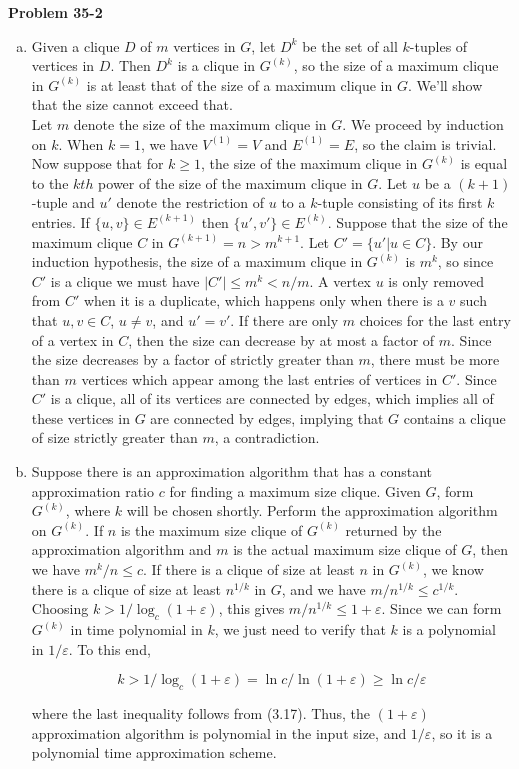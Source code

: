 \documentclass{article}
\begin{document}
\noindent\textbf{Problem 35-2}
\begin{enumerate}[a.]
\item Given a clique $D$ of $m$ vertices in $G$, let $D^{k}$ be the set of all $k$-tuples of vertices in $D$.  Then $D^k$ is a clique in $G^{(k)}$, so the size of a maximum clique in $G^{(k)}$ is at least that of the size of a maximum clique in $G$.  We'll show that the size cannot exceed that. \\

Let $m$ denote the size of the maximum clique in $G$.  We proceed by induction on $k$.  When $k=1$, we have $V^{(1)} = V$ and $E^{(1)} = E$, so the claim is trivial.  Now suppose that for $k \geq 1$, the size of the maximum clique in $G^{(k)}$ is equal to the $kth$ power of the size of the maximum clique in $G$.  Let $u$ be a $(k+1)$-tuple and $u'$ denote the restriction of $u$ to a $k$-tuple consisting of its first $k$ entries.  If $\{u,v\} \in E^{(k+1)}$ then $\{u',v'\} \in E^{(k)}$.  Suppose that the size of the maximum clique $C$ in $G^{(k+1)} = n > m^{k+1}$.  Let $C' = \{u' | u \in C\}$.  By our induction hypothesis, the size of a maximum clique in $G^{(k)}$ is $m^k$, so since $C'$ is a clique we must have $|C'| \leq m^k < n/m$.  A vertex $u$ is only removed from $C'$ when it is a duplicate, which happens only when there is a $v$ such that $u, v \in C$, $u \neq v$, and $u' = v'$.  If there are only $m$ choices for the last entry of a vertex in $C$, then the size can decrease by at most a factor of $m$.  Since the size decreases by a factor of strictly greater than $m$, there must be more than $m$ vertices which appear among the last entries of vertices in $C'$.  Since $C'$ is a clique, all of its vertices are connected by edges, which implies all of these vertices in $G$ are connected by edges, implying that $G$ contains a clique of size strictly greater than $m$, a contradiction.  

\item Suppose there is an approximation algorithm that has a constant approximation ratio $c$ for finding a maximum size clique.  Given $G$, form $G^{(k)}$, where $k$ will be chosen shortly.  Perform the approximation algorithm on $G^{(k)}$.  If $n$ is the maximum size clique of $G^{(k)}$ returned by the approximation algorithm and $m$ is the actual maximum size clique of $G$, then we have $m^k/n \leq c$.  If there is a clique of size at least $n$ in $G^{(k)}$, we know there is a clique of size at least $n^{1/k}$ in $G$, and we have $m/n^{1/k} \leq c^{1/k}$.  Choosing $k > 1/\log_c(1+\varepsilon)$, this gives $m/n^{1/k} \leq 1+\varepsilon$. Since we can form $G^{(k)}$ in time polynomial in $k$, we just need to verify that $k$ is a polynomial in $1/\varepsilon$.  To this end, 

\[ k > 1/\log_c(1+\varepsilon) = \ln c / \ln(1 + \varepsilon) \geq \ln c/\varepsilon\]

where the last inequality follows from (3.17).  Thus, the $(1+\varepsilon)$ approximation algorithm is polynomial in the input size, and $1/\varepsilon$, so it is a polynomial time approximation scheme.

\end{enumerate}
\end{document}
